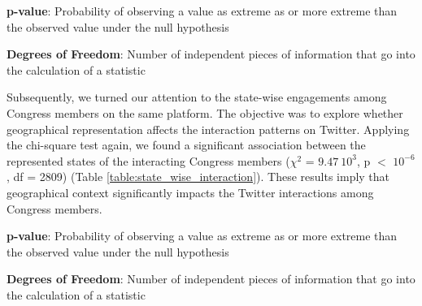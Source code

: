 \documentclass[11pt]{article}
\begin{document}
\begin{table}[h]
\caption{Chi-square test of party-wise retweet interaction.}
\label{table:party_wise_interaction}
\begin{threeparttable}
\renewcommand{\TPTminimum}{\linewidth}
\begin{tablenotes}
\footnotesize
\item \textbf{p-value}: Probability of observing a value as extreme as or more extreme than the observed value under the null hypothesis
\item \textbf{Degrees of Freedom}: Number of independent pieces of information that go into the calculation of a statistic
\end{tablenotes}
\end{threeparttable}
\end{table}


Subsequently, we turned our attention to the state-wise engagements among Congress members on the same platform. The objective was to explore whether geographical representation affects the interaction patterns on Twitter. Applying the chi-square test again, we found a significant association between the represented states of the interacting Congress members ($\chi^2$ = $9.47\ 10^{3}$, p $<$ $10^{-6}$, df = 2809) (Table \ref{table:state_wise_interaction}). These results imply that geographical context significantly impacts the Twitter interactions among Congress members. 

\begin{table}[h]
\caption{Chi-square test of state-wise retweet interaction.}
\label{table:state_wise_interaction}
\begin{threeparttable}
\renewcommand{\TPTminimum}{\linewidth}
\begin{tablenotes}
\footnotesize
\item \textbf{p-value}: Probability of observing a value as extreme as or more extreme than the observed value under the null hypothesis
\item \textbf{Degrees of Freedom}: Number of independent pieces of information that go into the calculation of a statistic
\end{tablenotes}
\end{threeparttable}
\end{table}
\end{document}
